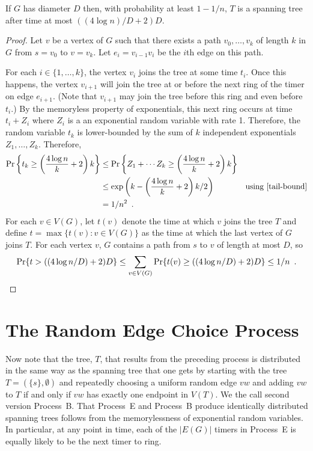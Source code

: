 \documentclass[lotsofwhite]{patmorin}
\begin{document}
\begin{lem}
  If $G$ has diameter $D$ then, with probability at least $1-1/n$, $T$
  is a spanning tree after time at most $((4\log n)/D+2)D$.
\end{lem}


\begin{proof}
  Let $v$ be a vertex of $G$ such that there exists a path
  $v_0,\ldots,v_k$ of length $k$ in $G$ from $s=v_0$ to $v=v_k$.
  Let $e_i=v_{i-1}v_i$ be the $i$th edge on this path.

  For each $i\in\{1,\ldots,k\}$, the vertex $v_i$ joins the tree at some
  time $t_i$.  Once this happens, the vertex $v_{i+1}$ will join the tree
  at or before the next ring of the timer on edge $e_{i+1}$.  (Note that
  $v_{i+1}$ may join the tree before this ring and even before $t_i$.)
  By the memoryless property of exponentials, this next ring occurs at
  time $t_i+Z_i$ where $Z_i$ is a an exponential random variable with
  rate 1.  Therefore, the random variable $t_k$ is lower-bounded by the
  sum of $k$ independent exponentials $Z_1,\ldots,Z_k$.  Therefore,
  \begin{align*}
      \Pr\left\{t_k\ge \left(\frac{4\log n}{k}+2\right)k\right\} 
        & \le \Pr\left\{Z_1+\cdots Z_k\ge \left(\frac{4\log n}{k}+2\right)k\right\} \\ 
        & \le \exp\left(k - \left(\frac{4\log n}{k}+2\right)k/2\right) 
            & \text{using \eqref{tail-bound}} \\
      & = 1/n^2 \enspace .
  \end{align*}
  For each $v\in V(G)$, let $t(v)$ denote the time at which $v$ joins
  the tree $T$ and define $t=\max\{t(v):v\in V(G)\}$
  as the time at which the last vertex of $G$ joins 
  $T$.  For each vertex $v$, $G$ contains a path from $s$ to $v$ of length
  at most $D$, so
  \[
      \Pr\{t> ((4\log n/D)+2)D\} \le \sum_{v\in V(G)}\Pr\{t(v) \ge ((4\log n/D)+2)D\}     
       \le 1/n \enspace . \qedhere
  \]
\end{proof}

\section{The Random Edge Choice Process}

Now note that the tree, $T$, that results from the preceding process
is distributed in the same way as the spanning tree that one gets by
starting with the tree $T=(\{s\},\emptyset)$ and repeatedly choosing
a uniform random edge $vw$ and adding $vw$ to $T$ if and only if $vw$
has exactly one endpoint in $V(T)$.  We the call second version Process~B.
That Process~E and Process~B produce identically distributed spanning
trees follows from the memorylessness of exponential random variables.
In particular, at any point in time, each of the $|E(G)|$ timers in
Process~E is equally likely to be the next timer to ring.
\end{document}
